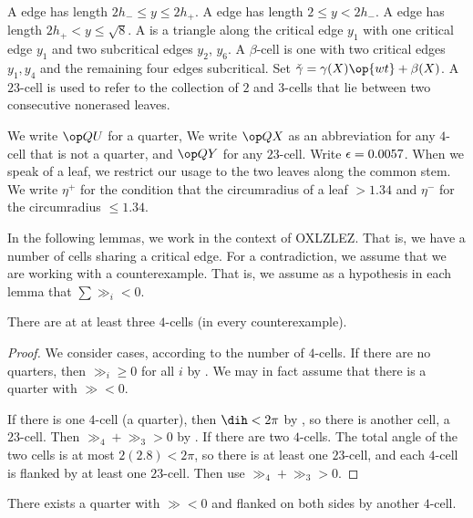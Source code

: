 \begin{definition}
A  edge has length $2h_-\le y\le 2h_+$.  A  edge has length $2\le y< 2h_-$.
A  edge has length $2h_+<y\le\sqrt8$.
A  is a triangle along the critical edge $y_1$ with one critical edge $y_1$ and two
subcritical edges $y_2$, $y_6$.
A $\beta$-cell is one with two critical edges $y_1,y_4$ and the remaining four edges subcritical.
Set $\gg = \gamma(X)\op{wt} + \beta(X)$.
A $23$-cell is used to refer to the collection of $2$ and $3$-cells that lie between two consecutive nonerased leaves.

We write $\QU$ for a quarter,
We write $\QX$ as an abbreviation for any $4$-cell that is not a quarter,
and $\QY$ for any $23$-cell. Write $\epsilon=0.0057$.
When we speak of a leaf, we restrict our usage to the two leaves along the common stem.
We write $\eta^+$ for the condition that the circumradius of a leaf $>1.34$ and
$\eta^-$ for the circumradius $\le 1.34$.
\end{definition}

In the following lemmas, we work in the context of OXLZLEZ.  That is, we have a number of cells sharing
a critical edge.  For a contradiction, we assume that we are working with a counterexample.  That is,
we assume as a hypothesis in each lemma that $\sum \gg_i < 0$.

\begin{lemma}\label{lemma:ox34}
There are at at least three $4$-cells (in every counterexample).
\end{lemma}

\begin{proof} We consider cases, according to the number of $4$-cells.  If there are no quarters, then
$\gg_i\ge0$ for all $i$ by .
We may in fact assume that there is a quarter with $\gg<0$.

If there is one $4$-cell (a quarter), then $\dih < 2\pi$ by , so there is another cell, a $23$-cell.
Then $\gg_4 + \gg_3 > 0$ by .
If there are two $4$-cells.  The total angle of the two cells is at most $2 (2.8) < 2\pi$, so there is at least one $23$-cell, and each $4$-cell is flanked by at least one $23$-cell.
Then use $\gg_4+\gg_3>0$.
\end{proof}

\begin{lemma}\label{lemma:ox2} 
There exists a quarter with $\gg<0$ and flanked on both sides by another $4$-cell.
\end{lemma}

